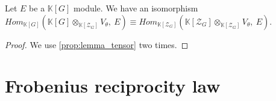 \begin{proposition}
    \label{prop:induced_property}
    \leanok 
    Let $E$ be a $\mathbb{K}[G]$ module. We have an isomorphism $Hom_{\mathbb{K}[G]}
    \left(\mathbb{K}[G]\otimes_{\mathbb{K}[\mathcal{Z}_G]}V_\theta,\ E\right)\equiv Hom_{\mathbb{K}[\mathcal{Z}_G]}
    \left(\mathbb{K}[\mathcal{Z}_G]\otimes_{\mathbb{K}[\mathcal{Z}_G]}V_\theta,\ E\right)$.
\end{proposition}
\begin{proof}
    \leanok
    We use \ref{prop:lemma_tensor} two times.
\end{proof}


\section{Frobenius reciprocity law}

